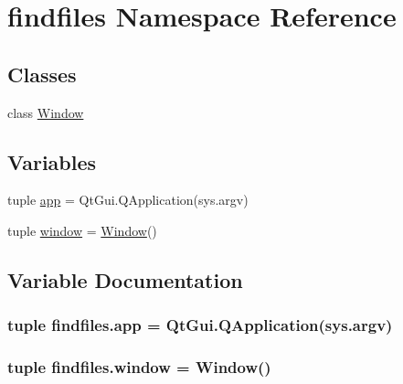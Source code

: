 \hypertarget{namespacefindfiles}{}\section{findfiles Namespace Reference}
\label{namespacefindfiles}
\subsection*{Classes}
\begin{DoxyCompactItemize}
\item 
class \hyperlink{classfindfiles_1_1Window}{Window}
\end{DoxyCompactItemize}
\subsection*{Variables}
\begin{DoxyCompactItemize}
\item 
tuple \hyperlink{namespacefindfiles_a0efe465cb2c141314aa1fa941f53ec2f}{app} = Qt\+Gui.\+Q\+Application(sys.\+argv)
\item 
tuple \hyperlink{namespacefindfiles_afc6338d87133065e6f9137f7b260b2cd}{window} = \hyperlink{classfindfiles_1_1Window}{Window}()
\end{DoxyCompactItemize}


\subsection{Variable Documentation}
\hypertarget{namespacefindfiles_a0efe465cb2c141314aa1fa941f53ec2f}{}
\subsubsection[{app}]{\setlength{\rightskip}{0pt plus 5cm}tuple findfiles.\+app = Qt\+Gui.\+Q\+Application(sys.\+argv)}\label{namespacefindfiles_a0efe465cb2c141314aa1fa941f53ec2f}
\hypertarget{namespacefindfiles_afc6338d87133065e6f9137f7b260b2cd}{}
\subsubsection[{window}]{\setlength{\rightskip}{0pt plus 5cm}tuple findfiles.\+window = {\bf Window}()}\label{namespacefindfiles_afc6338d87133065e6f9137f7b260b2cd}
